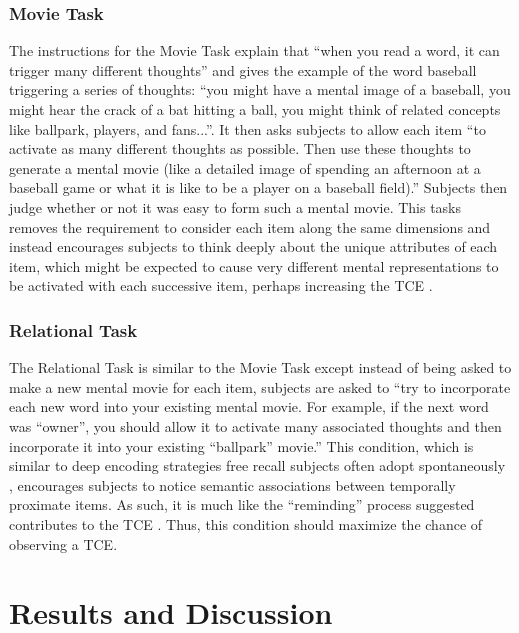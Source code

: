 \documentclass[jou,natbib,floatsintext]{apa6} %
\begin{document}
\subsubsection{Movie Task} The instructions for the Movie Task explain that ``when you read a word, it can trigger many different thoughts'' and gives the example of the word baseball triggering a series of thoughts: ``you might have a mental image of a baseball, you might hear the crack of a bat hitting a ball, you might think of related concepts like ballpark, players, and fans...''. It then asks subjects to allow each item ``to activate as many different thoughts as possible. Then use these thoughts to generate a mental movie (like a detailed image of spending an afternoon at a baseball game or what it is like to be a player on a baseball field).'' Subjects then judge whether or not it was easy to form such a mental movie. This tasks removes the requirement to consider each item along the same dimensions and instead encourages subjects to think deeply about the unique attributes of each item, which might be expected to cause very different mental representations to be activated with each successive item, perhaps increasing the TCE \citep[for a different prespective on the influence of item specific processing on the TCE, see][]{McDaEtal11}. 

\subsubsection{Relational Task} The Relational Task is similar to the Movie Task except instead of being asked to make a new mental movie for each item, subjects are asked to ``try to incorporate each new word into your existing mental movie. For example, if the next word was ``owner'', you should allow it to activate many associated thoughts and then incorporate it into your existing ``ballpark'' movie.'' This condition, which is similar to deep encoding strategies free recall subjects often adopt spontaneously \citep{DelaKnow05}, encourages subjects to notice semantic associations between temporally proximate items. As such, it is much like the ``reminding'' process \cite{Hint16} suggested contributes to the TCE \citep[for a similar manipulation see][]{BowClar69}. Thus, this condition should maximize the chance of observing a TCE. 

\section{Results and Discussion}
\end{document}
